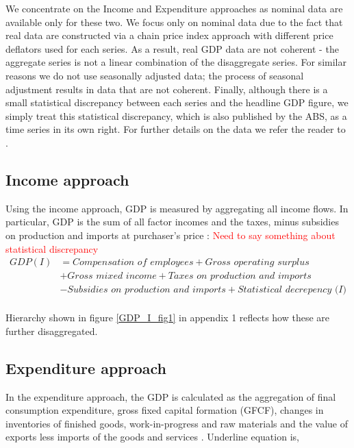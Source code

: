 \documentclass[graybox]{svmult}
\begin{document}
We concentrate on the Income and Expenditure approaches as nominal data are available only for these two. We focus only on  nominal data due to the fact that real data are constructed via a chain price index approach with different price deflators used for each series. As a result, real GDP data are not coherent - the aggregate series is not a linear combination of the disaggregate series.  For similar reasons we do not use seasonally adjusted data; the process of seasonal adjustment results in data that are not coherent.  Finally, although there is a small statistical discrepancy between each series and the headline GDP figure, we simply treat this statistical discrepancy, which is also published by the ABS, as a time series in its own right. For further details on the data we refer the reader to \citep{ABS2018}.

\subsection{Income approach}

Using the income approach, GDP is measured by aggregating all income flows. In particular, GDP is the sum of all factor incomes  and the taxes, minus subsidies on production and imports at purchaser's price \citep{ABS2015}:
\textcolor{red}{Need to say something about statistical discrepancy}
	\begin{align*}
	GDP(I) &= \textit{Compensation of employees} + \textit{Gross operating surplus}\\ &+ \textit{Gross mixed income}+ \textit{Taxes on production and imports}\\ &- \textit{Subsidies on production and imports} + \textit{Statistical decrepency (I)}\\
	\end{align*}

Hierarchy shown in figure \ref{GDP_I_fig1} in appendix 1 reflects how these are further disaggregated.

\subsection{Expenditure approach}

In the expenditure approach, the GDP is calculated as the aggregation of final consumption expenditure, gross fixed capital formation (GFCF), changes in inventories of finished goods, work-in-progress and raw materials and the value of exports less imports of the goods and services \citep{ABS2015}. Underline equation is,
\end{document}
